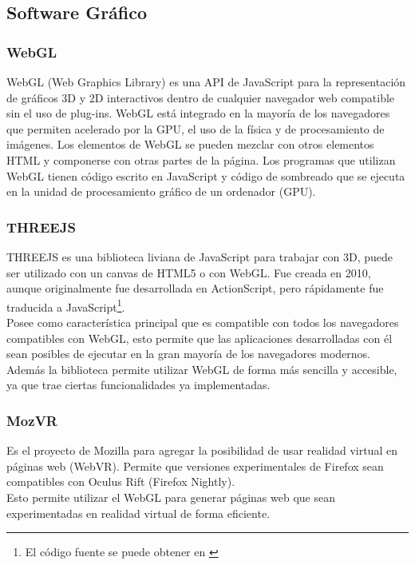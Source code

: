 \documentclass[12pt]{article}
\begin{document}
\subsection{Software Gráfico}
\subsubsection{WebGL}
WebGL (Web Graphics Library) es una API de JavaScript para la representación  de gráficos 3D y 2D  interactivos dentro de cualquier navegador web compatible sin el uso de plug-ins. WebGL está integrado en la mayoría de los navegadores que permiten acelerado por la GPU, el uso de la física y de procesamiento de imágenes. Los elementos de WebGL se pueden mezclar con otros elementos HTML y componerse con otras partes de la página. Los programas que utilizan WebGL tienen código escrito en JavaScript y  código de sombreado que se ejecuta en la unidad de procesamiento gráfico de un ordenador (GPU). 
\subsubsection{THREEJS}

THREEJS es una biblioteca liviana\cite{three} de JavaScript para trabajar con 3D, puede ser utilizado con un canvas de HTML5 o con WebGL. Fue creada en 2010, aunque originalmente fue desarrollada en ActionScript, pero rápidamente fue traducida a JavaScript\footnote{El código fuente se puede obtener en \cite{codigothree}}.
\\Posee como característica principal que es compatible con todos los navegadores compatibles con WebGL, esto permite que las aplicaciones desarrolladas con él sean posibles de ejecutar en la gran mayoría de los navegadores modernos.
\\Además la biblioteca permite utilizar WebGL de forma más sencilla y accesible, ya que trae ciertas funcionalidades ya implementadas.
\subsubsection{MozVR}
Es el proyecto de Mozilla para agregar la posibilidad de usar realidad virtual en páginas web (WebVR)\cite{mozvr}. Permite que versiones experimentales de Firefox sean compatibles con Oculus Rift (Firefox Nightly\cite{nightly}).
\\Esto permite utilizar el WebGL para generar páginas web que sean experimentadas en realidad virtual de forma eficiente.
\end{document}
